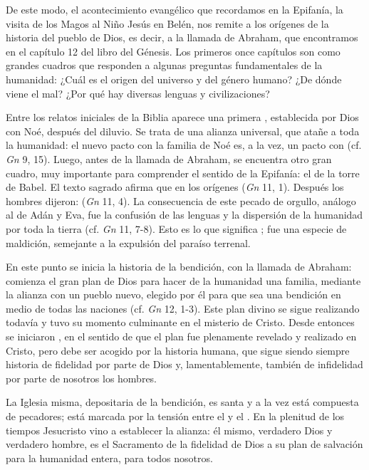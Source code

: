 \begin{body}
\begin{body}
{De este modo, el acontecimiento evangélico que recordamos en la Epifanía, la visita de los Magos al Niño Jesús en Belén, nos remite a los orígenes de la historia del pueblo de Dios, es decir, a la llamada de Abraham, que encontramos en el capítulo 12 del libro del Génesis. Los primeros once capítulos son como grandes cuadros que responden a algunas preguntas fundamentales de la humanidad: ¿Cuál es el origen del universo y del género humano? ¿De dónde viene el mal? ¿Por qué hay diversas lenguas y civilizaciones?

Entre los relatos iniciales de la Biblia aparece una primera , establecida por Dios con Noé, después del diluvio. Se trata de una alianza universal, que atañe a toda la humanidad: el nuevo pacto con la familia de Noé es, a la vez, un pacto con  (cf. \emph{Gn} 9, 15). Luego, antes de la llamada de Abraham, se encuentra otro gran cuadro, muy importante para comprender el sentido de la Epifanía: el de la torre de Babel. El texto sagrado afirma que en los orígenes  (\emph{Gn} 11, 1). Después los hombres dijeron:  (\emph{Gn} 11, 4). La consecuencia de este pecado de orgullo, análogo al de Adán y Eva, fue la confusión de las lenguas y la dispersión de la humanidad por toda la tierra (cf. \emph{Gn} 11, 7-8). Esto es lo que significa ; fue una especie de maldición, semejante a la expulsión del paraíso terrenal.

En este punto se inicia la historia de la bendición, con la llamada de Abraham: comienza el gran plan de Dios para hacer de la humanidad una familia, mediante la alianza con un pueblo nuevo, elegido por él para que sea una bendición en medio de todas las naciones (cf. \emph{Gn} 12, 1-3). Este plan divino se sigue realizando todavía y tuvo su momento culminante en el misterio de Cristo. Desde entonces se iniciaron , en el sentido de que el plan fue plenamente revelado y realizado en Cristo, pero debe ser acogido por la historia humana, que sigue siendo siempre historia de fidelidad por parte de Dios y, lamentablemente, también de infidelidad por parte de nosotros los hombres.

La Iglesia misma, depositaria de la bendición, es santa y a la vez está compuesta de pecadores; está marcada por la tensión entre el  y el . En la plenitud de los tiempos Jesucristo vino a establecer la alianza: él mismo, verdadero Dios y verdadero hombre, es el Sacramento de la fidelidad de Dios a su plan de salvación para la humanidad entera, para todos nosotros.

}
\end{body}
\end{body}
